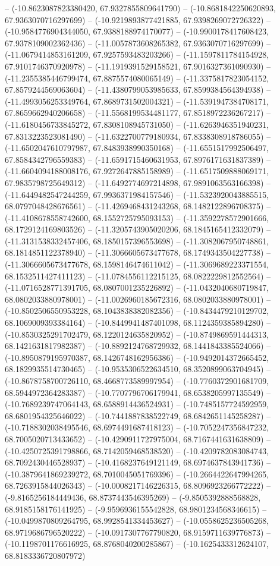 -- (-10.8623087823380420, 67.9327855809641790) -- (-10.8681842250620893, 67.9363070716297699) -- (-10.9219893877421885, 67.9398269072726322) -- (-10.9584776904344050, 67.9388188974170077) -- (-10.9900178417608423, 67.9378109002362436) -- (-11.0057873608265382, 67.9363070716297699) -- (-11.0679414853161209, 67.9257593483203266) -- (-11.1597811784154928, 67.9101746370920978) -- (-11.1919391529158521, 67.9016327361090930) -- (-11.2355385446799474, 67.8875574080065149) -- (-11.3375817823054152, 67.8579244569063604) -- (-11.4380799053985633, 67.8599384564394938) -- (-11.4993056253349764, 67.8689731502004321) -- (-11.5391947384708171, 67.8659662940206658) -- (-11.5568199534481177, 67.8518972236267217) -- (-11.6180456733845272, 67.8308108945731050) -- (-11.6263946351940231, 67.8313223523081490) -- (-11.6322700779180934, 67.8338308918786055) -- (-11.6502047610797987, 67.8483938990350168) -- (-11.6551517992506497, 67.8584342796559383) -- (-11.6591715460631953, 67.8976171631837389) -- (-11.6604094188008176, 67.9272647885158989) -- (-11.6517509888069171, 67.9835798725649312) -- (-11.6492774697214898, 67.9891063563166398) -- (-11.6449482547244259, 67.9936371984157546) -- (-11.5323920043885515, 68.0797048428676561) -- (-11.4269468431243268, 68.1482122896708375) -- (-11.4108678558742600, 68.1552725795093153) -- (-11.3592278572901666, 68.1729124169803526) -- (-11.3205743905020206, 68.1845165412332079) -- (-11.3131538332457406, 68.1850157396553698) -- (-11.3082067950748861, 68.1814851122378940) -- (-11.3066605673477678, 68.1749343504227738) -- (-11.3066605673477678, 68.1598146474611042) -- (-11.3069689223371554, 68.1532511427411123) -- (-11.0784556112215125, 68.0822229812552564) -- (-11.0716528771391705, 68.0807001235226892) -- (-11.0432040680719847, 68.0802033880978001) -- (-11.0026960185672316, 68.0802033880978001) -- (-10.8502506550953228, 68.1043838382082356) -- (-10.8434479210129702, 68.1069009393384164) -- (-10.8449941487401098, 68.1124359385894280) -- (-10.8530325291702479, 68.1220124635820952) -- (-10.8749869591444313, 68.1421631817982387) -- (-10.8892124768729932, 68.1441843385524066) -- (-10.8950879195970387, 68.1426748162956386) -- (-10.9492014372665452, 68.1829935514730465) -- (-10.9535306522634510, 68.3520899063704945) -- (-10.8678758700726110, 68.4668773589997954) -- (-10.7760372901681709, 68.5944972364283387) -- (-10.7707796706179941, 68.6538205997135549) -- (-10.7689239747064143, 68.6588914436524931) -- (-10.7485157724592959, 68.6801954325646022) -- (-10.7441887838522749, 68.6842651145258287) -- (-10.7188302038495546, 68.6974491687418123) -- (-10.7052247356847232, 68.7005020713433652) -- (-10.4290911727975004, 68.7167441631638809) -- (-10.4250725391798866, 68.7142059468538520) -- (-10.4209782083084743, 68.7092430446528937) -- (-10.4168237649121149, 68.6974637843941736) -- (-10.3879641869239272, 68.7010045051769396) -- (-10.2664422647994265, 68.7263915844026343) -- (-10.0008217146226315, 68.8096923266772222) -- (-9.8165256184449436, 68.8737443546395269) -- (-9.8505392888568828, 68.9185158176141925) -- (-9.9596936155542828, 68.9801234568346615) -- (-10.0499870809264795, 68.9928541334453627) -- (-10.0558625236505268, 68.9719686796520222) -- (-10.0917307767790820, 68.9159711639776873) -- (-10.1198701176616925, 68.8768040200285867) -- (-10.1625433312624107, 68.8183336720807972) 